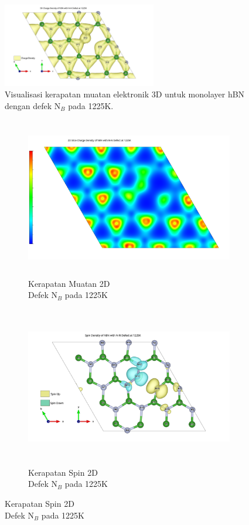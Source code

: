 \begin{figure}[h!]
    \centering
    \includegraphics[width=0.6\textwidth]{gambar_hasil/hBN_rho_3D_NN_1225K.png}
    \caption{Visualisasi kerapatan muatan elektronik 3D untuk monolayer hBN dengan defek N$_B$ pada 1225K.}
    \label{fig:hbn_NN_1225K_chargedensity}
\end{figure}

\begin{figure}[h!]
    \centering
    \begin{subfigure}[b]{0.45\textwidth}
        \centering
        \includegraphics[width=\linewidth,height=7cm,keepaspectratio]{gambar_hasil/hBN_rho_NN_1225K.png}
        \caption{Kerapatan Muatan 2D\\Defek N$_B$ pada 1225K}
        \label{fig:2D_charge_density_NN_1225K}
    \end{subfigure}
    \hfill
    \begin{subfigure}[b]{0.45\textwidth}
        \centering
        \includegraphics[width=\linewidth,height=7cm,keepaspectratio]{gambar_hasil/hBN_spin_NN_1225K.png}
        \caption{Kerapatan Spin 2D\\Defek N$_B$ pada 1225K}
        \label{fig:spin_density_NN_1225K}
    \end{subfigure}


\end{figure}
